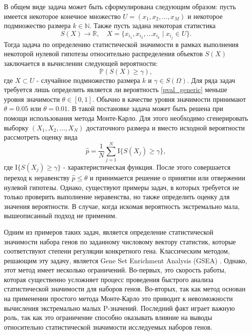 В общем виде задача может быть сформулирована следующим образом: пусть имеется некоторое конечное множество $U = \left(x_1, x_2, \ldots, x_M \right)$ и некоторое подмножество размера $k \in \mathbb{N}$. Также пусть задана некоторая статистика 
\begin{equation*} 
    S(X) \rightarrow \mathbb{R}, \quad X = \{x_{i_1}, x_{i_2}, \ldots x_{i_k} \mid x_{i_j} \in U\}.
\end{equation*}
Тогда задача по определению статистической значимости в рамках выполнения некоторой нулевой гипотезы относительно распределения объектов $S(X)$ заключается в вычислении следующей вероятности:
\begin{equation}\label{pval_generic}
    \mathbb{P} \left(S(X) \geqslant \gamma \right),
\end{equation}
где $X \subset U$ - случайное подмножество размера $k$ и $\gamma \in S(\Omega)$.
Для ряда задач требуется лишь определить является ли вероятность \ref{pval_generic} меньше уровня значимости $\theta \in [0, 1]$.
Обычно в качестве уровня значимости принимают $\theta = 0.05$ или $\theta = 0.01$.
В такой постановке задача может быть решена при помощи использования метода Монте-Карло.
Для этого необходимо сгенерировать выборку $\left(X_1, X_2, \ldots, X_N \right)$ достаточного размера и вместо исходной вероятности рассмотреть оценку вида
\begin{equation}\label{phat_crude}
    \hat{p} = \frac{1}{N} \sum\limits_{j = 1}^{N} \mathrm{I} \{S(X_j) \geqslant \gamma \},
\end{equation}
где $\mathrm{I} \{S(X_j) \geqslant \gamma \}$ - характеристическая функция. 
После этого совершается переход к неравенству $\hat{p} \leqslant \theta$ и принимается решение о принятии или отвержении нулевой гипотезы.
Однако, существуют примеры задач, в которых требуется не только проверить выполнение неравенства, но также определить оценку для значения вероятности.
В случае, когда искомая вероятность экстремально мала, вышеописанный подход не применим.

Одним из примеров таких задач, является определение статистической значимости набора генов по заданному числовому вектору статистик, которые соответствуют степени регуляции конкретного гена.
Классическим методом, решающим эту задачу, является Gene Set Enrichment Analysis (GSEA) \cite{subramanian2005gene}.
Однако, этот метод имеет несколько ограничений.
Во-первых, это скорость работы, которая существенно усложняет процесс проведения быстрого анализа статистической значимости для наборов генов.
Во-вторых, так как метод основан на применении простого метода Монте-Карло это приводит к невозможности вычисления экстремально малых P-значений.
Последний факт играет важную роль, так как это ограничение способно оказывать влияние на выводы относительно статистической значимости исследуемых наборов генов.

